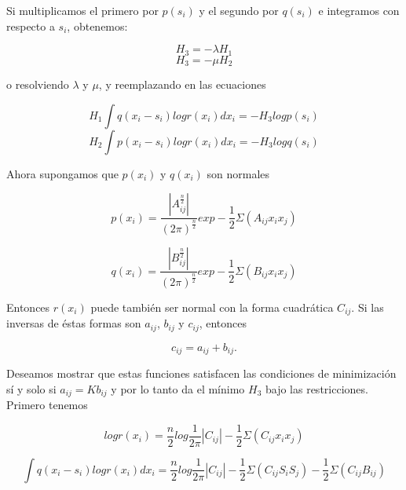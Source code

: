 Si multiplicamos el primero por $p(s_{i})$ y el segundo por $q(s_{i})$ e integramos con 
respecto a $s_{i}$, obtenemos:

\begin{equation} H_{3} = -\lambda H_{1} \end{equation}
\begin{equation} H_{3} = -\mu H_{2} \end{equation}
			
o resolviendo $\lambda$ y $\mu$, y reemplazando en las ecuaciones

\begin{equation} H_{1} \int q(x_{i} - s_{i}) logr(x_{i}) dx_{i} = - H_{3} log p(s_{i}) \end{equation}
\begin{equation} H_{2} \int p(x_{i} - s_{i}) logr(x_{i}) dx_{i} = - H_{3} log q(s_{i}) \end{equation}

Ahora supongamos que $p(x_{i})$ y $q(x_{i})$ son normales

\begin{equation} p(x_{i}) = \frac{|A_{ij}^{\frac{n}{2}}|}{(2\pi)^{\frac{n}{2}}} exp - \frac{1}{2} \Sigma(A_{ij} x_{i} x_{j}) \end{equation}

\begin{equation} q(x_{i}) = \frac{|B_{ij}^{\frac{n}{2}}|}{(2\pi)^{\frac{n}{2}}} exp - \frac{1}{2} \Sigma(B_{ij} x_{i} x_{j}) \end{equation}

Entonces $r(x_{i})$ puede tambi\'en ser normal con la forma cuadr\'atica $C_{ij}$. Si las inversas
de \'estas formas son $a_{ij}$, $b_{ij}$ y $c_{ij}$, entonces 

\begin{equation} c_{ij} = a_{ij} + b_{ij}. \end{equation}
				
Deseamos mostrar que estas funciones satisfacen las condiciones de minimizaci\'on s\'i y
solo si $a_{ij} = Kb_{ij}$ y por lo tanto da el m\'inimo $H_{3}$ bajo las restricciones. Primero
tenemos

\begin{equation} logr(x_{i}) = \frac{n}{2} log \frac{1}{2\pi} |C_{ij}| - \frac{1}{2} \Sigma(C_{ij} x_{i} x_{j}) \end{equation}
			
\begin{equation} \int q(x_{i} - s_{i}) logr(x_{i}) dx_{i} = \frac{n}{2} log \frac{1}{2\pi} |C_{ij}| - 
\frac{1}{2} \Sigma(C_{ij}S_{i}S_{j}) - \frac{1}{2} \Sigma(C_{ij} B_{ij}) \end{equation}
		
